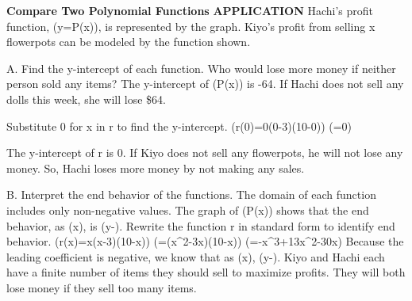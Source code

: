\documentclass{article}
\newenvironment{example}[1]{}{}         %
\newcommand{\answer}[1]{}               %
\newcommand{\placeholder}[2]{}          %
\newcommand{\te}[1]{}                   %
\begin{document}
\begin{example}{5}
\textbf{Compare Two Polynomial Functions}
\textbf{APPLICATION}
Hachi's profit function, (y=P(x)), is represented by the graph. Kiyo's profit from selling x flowerpots can be modeled by the function shown.
\placeholder{illustration}{Two market stalls, Hachi's Dolls at left and Kiyo's Flower Pots at right. Left stall contains a blue downward parabola graph, a doll on a pedestal, and two small shelf dolls. Right stall displays flowerpots on a table and the equation r(x)=x(x-3)(10-x) on its backdrop.}
\placeholder{graph}{Hachi's Dolls stall graph: blue downward parabola with red filled y-intercept labeled (0,-64), peak near (9,100). Axes x,y; horizontal label Number of Items, ticks 4,8,12,16,20, grid spacing 2; vertical label Profit (\$), labels -60,-40,-20,0,20,40,60,80,100, grid spacing 10. Window approximately x[0,22], y[-70,110]. Curve crosses x-axis near 2 and 16 and descends beyond lower edge at right.}
A. Find the y-intercept of each function. Who would lose more money if neither person sold any items?
The y-intercept of (P(x)) is -64.
If Hachi does not sell any dolls this week, she will lose \$64.
\te{Callout: Hachi has startup costs, which she pays whether she sells any dolls or not.}
Substitute 0 for x in r to find the y-intercept.
(r(0)=0(0-3)(10-0))
(=0)
\te{Callout: Kiyo has no startup costs.}
The y-intercept of r is 0. If Kiyo does not sell any flowerpots, he will not lose any money. So, Hachi loses more money by not making any sales.
\answer{A. P: -64; r: 0; Hachi loses more money by not making any sales.}
B. Interpret the end behavior of the functions.
The domain of each function includes only non-negative values.
The graph of (P(x)) shows that the end behavior, as (x\to\infty), is (y\to-\infty).
Rewrite the function r in standard form to identify end behavior.
(r(x)=x(x-3)(10-x))
(=(x^2-3x)(10-x))
(=-x^3+13x^2-30x)
Because the leading coefficient is negative, we know that as (x\to\infty), (y\to-\infty).
Kiyo and Hachi each have a finite number of items they should sell to maximize profits. They will both lose money if they sell too many items.
\answer{B. Both functions have (y\to-\infty) as (x\to\infty); both sellers lose money if they sell too many items.}
\te{USE STRUCTURE As x approaches positive infinity or negative infinity, the leading term of the polynomial determines the end behavior of the graph of the function.}
\end{example}
\end{document}
